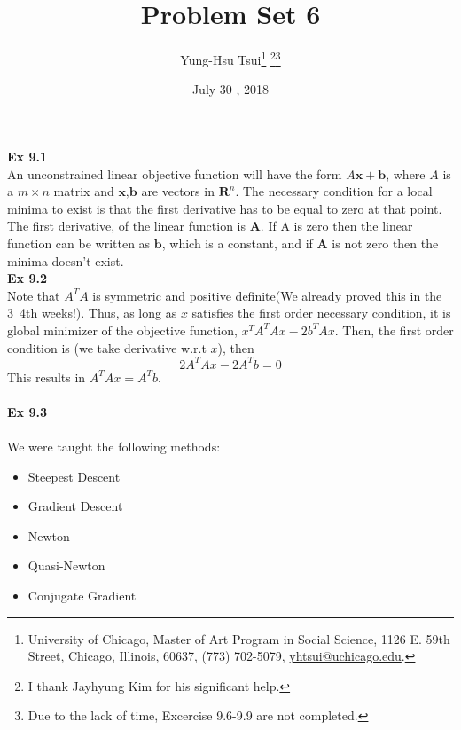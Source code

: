 \documentclass[letterpaper,12pt]{article}
\theoremstyle{definition}
\begin{document}
	\title{Problem Set 6\\
	}
	\author{
		Yung-Hsu Tsui\footnote{University of Chicago, Master of Art Program in Social Science, 1126 E. 59th Street, Chicago, Illinois, 60637, (773) 702-5079, \href{mailto:}{yhtsui@uchicago.edu}.} \footnote{I thank Jayhyung Kim for his significant help.}\footnote{Due to the lack of time, Excercise 9.6-9.9 are not completed.}\\[-2pt]
	}
	\date{July 30 ,  2018 }
	\vspace{-9mm}
	\maketitle
	\thispagestyle{empty}
	
	\pagestyle{fancy}
	\fancyhf{}
	\cfoot{\thepage}
	

\textbf{Ex 9.1} \\

An unconstrained linear objective function will have the form $A\textbf{x} + \textbf{b}$,  where $A$ is a $m \times n$ matrix and $\textbf{x,b}$ are vectors in $\textbf{R}^n$. The necessary condition for a local minima to exist is that the first derivative has to be equal to zero at that point.\\

The first derivative, of the linear function is $\textbf{A}$. If A is zero then the linear function can be written as $\textbf{b}$, which is a constant, and if $\textbf{A}$ is not zero then the minima doesn't exist. \\


\textbf{Ex 9.2} \\

Note that $A^T A$ is symmetric and positive definite(We already proved this in the 3~4th weeks!). Thus, as long as $x$ satisfies the first order necessary condition, it is global minimizer of the objective function, $x^T A^T A x -2b^T Ax$. Then, the first order condition is (we take derivative w.r.t $x$), then
\[ 2 A^T A x - 2A^T b = 0\]
This results in $A^T A x = A^T b$.  \\\\


\textbf{Ex 9.3} \\\\
We were taught the following methods:
\begin{itemize}
	\item Steepest Descent
	\item Gradient Descent
	\item Newton
	\item Quasi-Newton
	\item Conjugate Gradient
\end{itemize}
\end{document}
